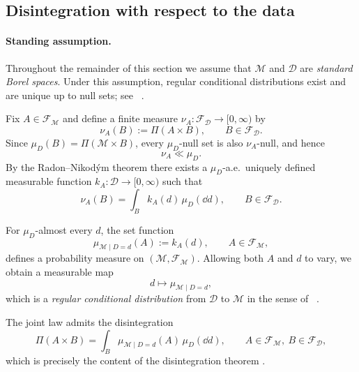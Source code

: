 \documentclass[11pt]{article}
\theoremstyle{remark}
\newcommand{\modelspace}{\mathcal{M}}
\newcommand{\dataspace}{\mathcal{D}}
\begin{document}
\subsection{Disintegration with respect to the data}

\paragraph{Standing assumption.}
Throughout the remainder of this section we assume that
\(\modelspace\) and \(\dataspace\) are \emph{standard Borel spaces}.  Under this
assumption, regular conditional distributions exist and are unique up to
null sets; see ~\cite[Theorem~5.3]{Kallenberg2021}.

Fix \(A\in\mathcal F_{\modelspace}\) and define a finite measure
\(\nu_A:\mathcal F_{\dataspace}\to[0,\infty)\) by
\begin{equation}
  \nu_A(B) := \Pi(A\times B),
  \qquad
  B\in\mathcal F_{\dataspace}.
\end{equation}
Since \(\mu_D(B)=\Pi(\modelspace\times B)\), every \(\mu_D\)-null set is also
\(\nu_A\)-null, and hence
\begin{equation}
  \nu_A \ll \mu_D .
\end{equation}
By the Radon--Nikodým theorem there exists a
\(\mu_D\)-a.e.\ uniquely defined measurable function
\(k_A:\dataspace\to[0,\infty)\) such that
\begin{equation}
  \nu_A(B)
  =
  \int_B k_A(d)\,\mu_D(\dd d),
  \qquad
  B\in\mathcal F_{\dataspace}.
\end{equation}

For \(\mu_D\)-almost every \(d\), the set function
\begin{equation}
  \mu_{\modelspace\mid D=d}(A)
  :=
  k_A(d),
  \qquad
  A\in\mathcal F_{\modelspace},
\end{equation}
defines a probability measure on
\((\modelspace,\mathcal F_{\modelspace})\).  Allowing both \(A\) and \(d\) to
vary, we obtain a measurable map
\begin{equation}
  d\longmapsto \mu_{\modelspace\mid D=d},
\end{equation}
which is a \emph{regular conditional distribution} from \(\dataspace\) to \(\modelspace\) in the sense of ~\cite[Equation~2 Chapter~5 and Theorem~5.3]{Kallenberg2021}.

The joint law admits the disintegration
\begin{equation}\label{eq:disintegration-model-given-data}
  \Pi(A\times B)
  =
  \int_B \mu_{\modelspace\mid D=d}(A)\,\mu_D(\dd d),
  \qquad
  A\in\mathcal F_{\modelspace},\ B\in\mathcal F_{\dataspace},
\end{equation}
which is precisely the content of the disintegration theorem
\cite[Theorem~5.4]{Kallenberg2021}.
\end{document}
